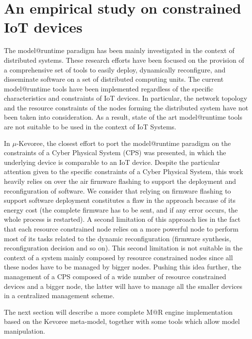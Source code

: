\section{An empirical study on constrained IoT devices}
The model@runtime paradigm has been mainly investigated in the context of distributed systems. 
These research efforts have been focused on the provision of a comprehensive set of tools to easily deploy, dynamically reconfigure, and disseminate software on a set of distributed computing units.
The current model@runtime tools have been implemented regardless of the specific characteristics and constraints of IoT devices.
In particular, the network topology and the resource constraints of the nodes forming the distributed system have not been taken into consideration.
As a result, state of the art model@runtime tools are not suitable to be used in the context of IoT Systems.

In \cite{fouquet2012dynamic} $\mu$-Kevoree, the closest effort to port the model@runtime paradigm on the constraints of a Cyber Physical System (CPS) was presented, in which the underlying device is comparable to an IoT device.
Despite the particular attention given to the specific constraints of a Cyber Physical System, this work heavily relies on over the air firmware flashing to support the deployment and reconfiguration of software. 
We consider that relying on firmware flashing to support software deployment constitutes a flaw in the approach because of its energy cost (the complete firmware has to be sent, and if any error occurs, the whole process is restarted).
A second limitation of this approach lies in the fact that each resource constrained node relies on a more powerful node to perform most of its tasks related to the dynamic reconfiguration (firmware synthesis, reconfiguration decision and so on).
This second limitation is not suitable in the context of a system mainly composed by resource constrained nodes since all these nodes have to be managed by bigger nodes.
Pushing this idea further, the management of a CPS composed of a wide number of resource constrained devices and a bigger node, the latter will have to manage all the smaller devices in a centralized management scheme.

The next section will describe a more complete M@R engine implementation based on the Kevoree meta-model, together with some tools which allow model manipulation.

